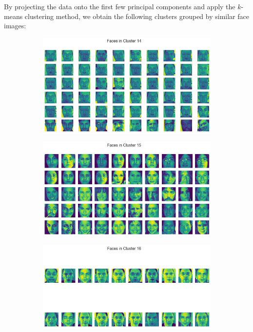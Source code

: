 By projecting the data onto the first few principal components and apply the $k$-means clustering method, we obtain the following clusters grouped by similar face images: 
\begin{figure}[H]
    \centering
    \begin{subfigure}[b]{0.45\textwidth}
        \includegraphics[width=\textwidth]{presentation/figures-face-results/face14.png}
    \end{subfigure}
    \hfill 
    \begin{subfigure}[b]{0.45\textwidth}
        \includegraphics[width=\textwidth]{presentation/figures-face-results/face15.png}
    \end{subfigure}
    \hfill
    \begin{subfigure}[b]{0.45\textwidth}
        \includegraphics[width=\textwidth]{presentation/figures-face-results/face16.png}

\end{subfigure}
\end{figure}
